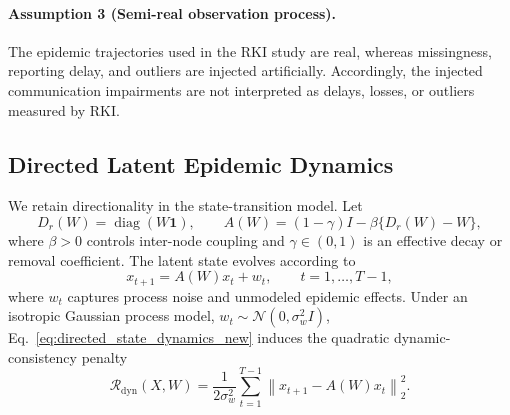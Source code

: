 \paragraph{Assumption 3 (Semi-real observation process).}
The epidemic trajectories used in the RKI study are real, whereas missingness, reporting delay, and outliers are injected artificially. Accordingly, the injected communication impairments are not interpreted as delays, losses, or outliers measured by RKI.

\subsection{Directed Latent Epidemic Dynamics}
\label{subsec:directed_dynamics}
We retain directionality in the state-transition model. Let
\begin{equation}
    D_r(W)=\operatorname{diag}(W\mathbf{1}),
    \qquad
    A(W)=(1-\gamma)I-\beta\{D_r(W)-W\},
    \label{eq:transition_operator_new}
\end{equation}
where $\beta>0$ controls inter-node coupling and $\gamma\in(0,1)$ is an effective decay or removal coefficient. The latent state evolves according to
\begin{equation}
    x_{t+1}=A(W)x_t+w_t,
    \qquad t=1,\ldots,T-1,
    \label{eq:directed_state_dynamics_new}
\end{equation}
where $w_t$ captures process noise and unmodeled epidemic effects. Under an isotropic Gaussian process model, $w_t\sim\mathcal{N}(0,\sigma_w^2I)$, Eq.~\eqref{eq:directed_state_dynamics_new} induces the quadratic dynamic-consistency penalty
\begin{equation}
    \mathcal{R}_{\mathrm{dyn}}(X,W)
    =\frac{1}{2\sigma_w^2}
    \sum_{t=1}^{T-1}
    \left\|x_{t+1}-A(W)x_t\right\|_2^2.
    \label{eq:dynamic_penalty_new}
\end{equation}

